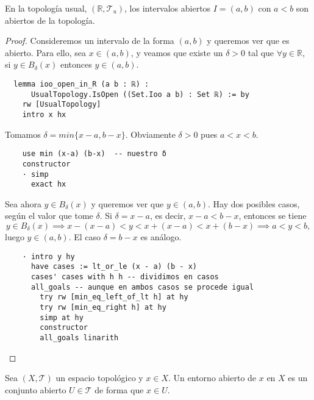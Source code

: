 \newpage
  
\begin{example}\label{ejemplo:intervalos-abiertos}
  En la topología usual, $(\mathbb{R}, \mathcal{T}_u)$, los intervalos abiertos $I = (a, b)$ con $a < b$ son abiertos de la topología.
\end{example}

\begin{proof}
  Consideremos un intervalo de la forma $(a, b)$ y queremos ver que es abierto. Para ello, sea $x \in (a, b)$, y veamos que existe un $\delta >0$ tal que $\forall y \in \mathbb{R}$, si $y \in B_\delta(x)$ entonces $y \in (a, b)$.

  \begin{lstlisting}
  lemma ioo_open_in_R (a b : ℝ) :
      UsualTopology.IsOpen ((Set.Ioo a b) : Set ℝ) := by
    rw [UsualTopology]
    intro x hx \end{lstlisting}

  Tomamos $\delta = min \{x-a, b-x\}$. Obviamente $\delta >0$ pues $a < x < b$.

  \begin{lstlisting}
    use min (x-a) (b-x)  -- nuestro δ
    constructor
    · simp
      exact hx \end{lstlisting}

  Sea ahora $y \in B_\delta(x)$ y queremos ver que $y \in (a, b)$. Hay dos posibles casos, según el valor que tome $\delta$. Si $\delta = x-a$, es decir, $x-a < b -x$, entonces se tiene
  $$
  y \in B_\delta(x) \implies x - (x - a) < y < x + (x - a) < x + (b - x) \implies a < y < b,
  $$
  luego $y \in (a, b)$. El caso $\delta = b -x$ es análogo.

  \begin{lstlisting}
    · intro y hy
      have cases := lt_or_le (x - a) (b - x)
      cases' cases with h h -- dividimos en casos
      all_goals -- aunque en ambos casos se procede igual
        try rw [min_eq_left_of_lt h] at hy
        try rw [min_eq_right h] at hy
        simp at hy
        constructor
        all_goals linarith \end{lstlisting}
\end{proof}

\begin{definition}
  Sea $(X, \mathcal{T})$ un espacio topológico y $x \in X$. Un \textnormal{entorno abierto} de $x$ en $X$ es un conjunto abierto $U \in \mathcal{T}$ de forma que $x \in U$.
\end{definition}


